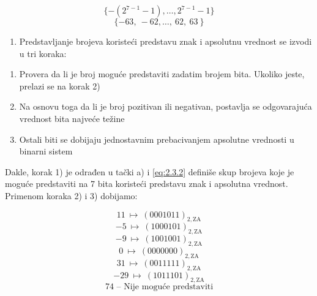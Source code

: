 \documentclass[a4paper,11pt]{article}
\numberwithin{equation}{section}
\begin{document}
\begin{equation}\label{eq:2.3.1}
\{-(2^{7-1}-1),\dots,2^{7-1}-1\}
\end{equation}
\begin{equation}\label{eq:2.3.2}
\{ - 63,\  - 62,\ldots,\ 62,\ 63\ \}
\end{equation}


\begin{enumerate}[label=\alph*),start=2,leftmargin=*]
\item Predstavljanje brojeva koristeći predstavu znak i apsolutnu vrednost se izvodi u tri koraka:

\end{enumerate}


\begin{enumerate}[label=\arabic*),start=1,leftmargin=*]
\item Provera da li je broj moguće predstaviti zadatim brojem bita. Ukoliko jeste, prelazi se na korak 2)

\item Na osnovu toga da li je broj pozitivan ili negativan, postavlja se odgovarajuća vrednost bita najveće težine

\item Ostali biti se dobijaju jednostavnim prebacivanjem apsolutne vrednosti u binarni sistem

\end{enumerate}


Dakle, korak 1) je odrađen u tački a) i \eqref{eq:2.3.2} definiše skup brojeva koje je moguće predstaviti na 7 bita koristeći predstavu znak i apsolutna vrednost. Primenom koraka 2) i 3) dobijamo:



\begin{equation}\label{eq:2.3.3}
11\ \longmapsto\ (0001011)_{2,\mathrm{ZA}}
\end{equation}
\begin{equation}\label{eq:2.3.4}
-5\ \longmapsto\ (1000101)_{2,\mathrm{ZA}}
\end{equation}
\begin{equation}\label{eq:2.3.5}
-9\ \longmapsto\ (1001001)_{2,\mathrm{ZA}}
\end{equation}
\begin{equation}\label{eq:2.3.6}
0\ \longmapsto\ (0000000)_{2,\mathrm{ZA}}
\end{equation}
\begin{equation}\label{eq:2.3.7}
31\ \longmapsto\ (0011111)_{2,\mathrm{ZA}}
\end{equation}
\begin{equation}\label{eq:2.3.8}
-29\ \longmapsto\ (1011101)_{2,\mathrm{ZA}}
\end{equation}
\begin{equation}\label{eq:2.3.9}
\text{74 – Nije moguće predstaviti}
\end{equation}
\end{document}
